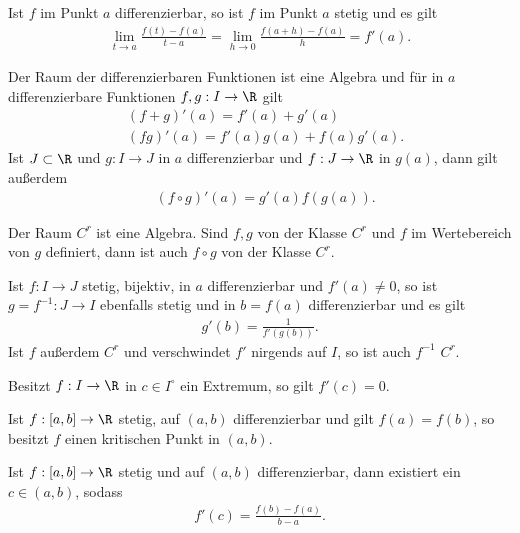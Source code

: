 \begin{prop}
Ist $f$ im Punkt $a$ differenzierbar, so ist $f$ im Punkt $a$ stetig und es gilt
\begin{align*}
\lim \limits_{t\to a} \frac{f(t)-f(a)}{t-a} =
\lim \limits_{h\to 0} \frac{f(a+h)-f(a)}{h} = f'(a).
\end{align*}
\end{prop}
\begin{prop}
Der Raum der differenzierbaren Funktionen ist eine Algebra und für
in $a$ differenzierbare Funktionen $f,g: I\to\R$ gilt  
\begin{align*}
& (f+g)'(a) = f'(a)+g'(a)\\
& (fg)'(a) = f'(a)g(a) + f(a)g'(a).
\end{align*}
Ist $J\subset \R$ und $g: I\to J$ in $a$ differenzierbar und $f: J\to\R$ in
$g(a)$, dann gilt außerdem
\begin{align*}
& (f\circ g)'(a) = g'(a)f(g(a)). 
\end{align*}
\end{prop}
\begin{prop}
Der Raum $C^r$ ist eine Algebra. Sind $f,g$ von der Klasse $C^r$ und $f$ im
Wertebereich von $g$ definiert, dann ist auch $f\circ g$ von der Klasse $C^r$.  
\end{prop}
\begin{prop}
Ist $f: I \to J$ stetig, bijektiv, in $a$ differenzierbar und $f'(a) \neq 0$,
so ist $g = f^{-1} : J\to I$ ebenfalls stetig und in $b = f(a)$
differenzierbar und es gilt
\begin{align*}
g'(b) = \frac{1}{f'(g(b))}.
\end{align*}
Ist $f$ außerdem $C^r$ und verschwindet $f'$ nirgends auf $I$, so ist auch
$f^{-1}$ $C^r$.
\end{prop}
\begin{prop}
Besitzt $f: I\to\R$ in $c\in I^\circ$ ein Extremum, so gilt
$f'(c) = 0$.
\end{prop}
\begin{prop}
Ist $f: [a,b]\to\R$ stetig, auf $(a,b)$ differenzierbar und gilt $f(a) = f(b)$,
so besitzt $f$ einen kritischen Punkt in $(a,b)$.
\end{prop}
\begin{prop}[Mittelwertsatz]
Ist $f: [a,b]\to\R$ stetig und auf $(a,b)$ differenzierbar, dann existiert ein
$c\in(a,b)$, sodass
\begin{align*}
f'(c) = \frac{f(b)-f(a)}{b-a}.
\end{align*}
\end{prop}
